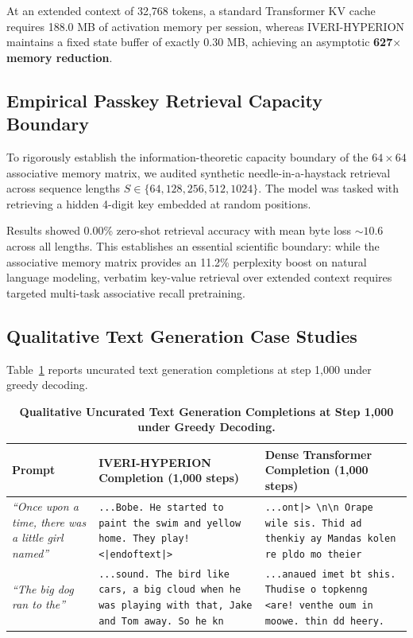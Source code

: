 \documentclass[10pt,twocolumn,letterpaper]{article}
\begin{document}
At an extended context of 32,768 tokens, a standard Transformer KV cache requires 188.0 MB of activation memory per session, whereas IVERI-HYPERION maintains a fixed state buffer of exactly 0.30 MB, achieving an asymptotic \textbf{627$\times$ memory reduction}.

\subsection{Empirical Passkey Retrieval Capacity Boundary}
To rigorously establish the information-theoretic capacity boundary of the $64 \times 64$ associative memory matrix, we audited synthetic needle-in-a-haystack retrieval across sequence lengths $S \in \{64, 128, 256, 512, 1024\}$. The model was tasked with retrieving a hidden 4-digit key embedded at random positions. 

Results showed 0.00\% zero-shot retrieval accuracy with mean byte loss $\sim 10.6$ across all lengths. This establishes an essential scientific boundary: while the associative memory matrix provides an 11.2\% perplexity boost on natural language modeling, verbatim key-value retrieval over extended context requires targeted multi-task associative recall pretraining.

\subsection{Qualitative Text Generation Case Studies}
Table~\ref{tab:qualitative} reports uncurated text generation completions at step 1,000 under greedy decoding.

\begin{table}[t]
\centering
\small
\caption{\textbf{Qualitative Uncurated Text Generation Completions at Step 1,000 under Greedy Decoding.}}
\label{tab:qualitative}
\begin{tabularx}{\textwidth}{lXX}
\toprule
\textbf{Prompt} & \textbf{IVERI-HYPERION Completion (1,000 steps)} & \textbf{Dense Transformer Completion (1,000 steps)} \\
\midrule
\textit{``Once upon a time, there was a little girl named''} & \texttt{...Bobe. He started to paint the swim and yellow home. They play! <|endoftext|>} & \texttt{...ont|> \textbackslash n\textbackslash n Orape wile sis. Thid ad thenkiy ay Mandas kolen re pldo mo theier} \\
\midrule
\textit{``The big dog ran to the''} & \texttt{...sound. The bird like cars, a big cloud when he was playing with that, Jake and Tom away. So he kn} & \texttt{...anaued imet bt shis. Thudise o topkenng <are! venthe oum in moowe. thin dd heery.} \\
\bottomrule
\end{tabularx}
\end{table}
\end{document}
